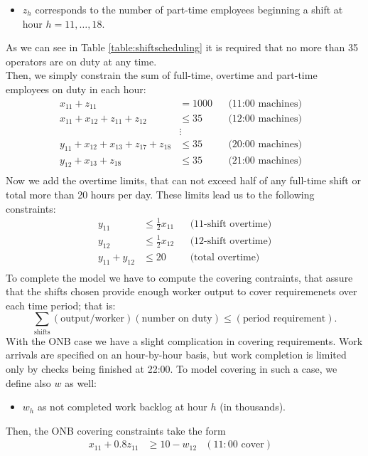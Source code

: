 \documentclass[a4paper,10 pt,titlepage,twoside]{report}
\theoremstyle{plain}
\theoremstyle{definition}
\theoremstyle{remark}
\begin{document}
{{\begin{itemize}
	\item $z_{h}$ corresponds to the number of part-time employees beginning a shift at hour $h=11, \dots, 18$.
\end{itemize}
As we can see in Table \ref{table:shiftscheduling} it is required that no more than 35 operators are on duty at any time. \\Then, we simply constrain the sum of full-time, overtime and part-time employees on duty in each hour:
\begin{align*}
x_{11}+z_{11}&= 1000&&\text{(11:00 machines)}&\\
x_{11}+x_{12}+z_{11}+z_{12}&\leq 35&&\text{(12:00 machines)}&\\
&\vdots&&\\
y_{11}+x_{12}+x_{13}+z_{17}+z_{18}&\leq35&&\text{(20:00 machines)}&\\
y_{12}+x_{13}+z_{18}&\leq35&&\text{(21:00 machines)}&\\
\end{align*}
Now we add the overtime limits, that can not exceed half of any full-time shift or total more than 20 hours per day. These limits lead us to the following constraints:
\begin{align*}
y_{11}&\leq \frac{1}{2}x_{11}&&\text{(11-shift overtime)}\\
      y_{12}&\leq \frac{1}{2}x_{12}&&\text{(12-shift overtime)}\\
y_{11}+y_{12}&\leq 20&&\text{(total overtime)}\\
\end{align*}
To complete the model we have to compute the covering contraints, that assure that the shifts chosen provide enough worker output to cover requiremenets over each time period; that is:
\begin{equation*}
\sum\limits_{\text{shifts}}(\text{output/worker})(\text{number on duty})\leq(\text{period requirement}).
\end{equation*}		
With the ONB case we have a slight complication in covering requirements. Work arrivals are specified on an hour-by-hour basis, but work completion is limited only by checks being finished at 22:00. To model covering in such a case, we define also $w$ as well:\begin{itemize}
\item $w_{h}$ as not completed work backlog at hour $h$ (in thousands).
\end{itemize}
Then, the ONB covering constraints take the form
\begin{align*}
x_{11}+0.8z_{11}&\geq 10 - w_{12}&(11:00 \text{ cover})&\\

\end{align*}}}
\end{document}
